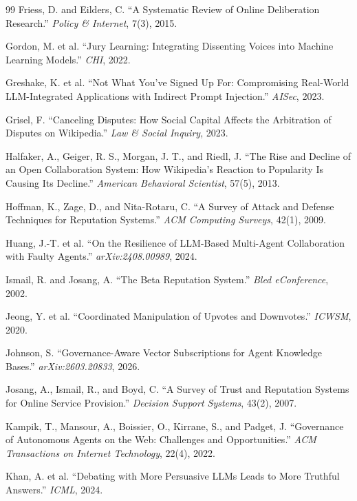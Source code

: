 \documentclass[11pt]{article}
\begin{document}
\begin{thebibliography}{99}
 Friess, D. and Eilders, C. ``A Systematic Review of Online Deliberation Research.'' \textit{Policy \& Internet}, 7(3), 2015.

 Gordon, M. et al. ``Jury Learning: Integrating Dissenting Voices into Machine Learning Models.'' \textit{CHI}, 2022.

 Greshake, K. et al. ``Not What You've Signed Up For: Compromising Real-World LLM-Integrated Applications with Indirect Prompt Injection.'' \textit{AISec}, 2023.

 Grisel, F. ``Canceling Disputes: How Social Capital Affects the Arbitration of Disputes on Wikipedia.'' \textit{Law \& Social Inquiry}, 2023.

 Halfaker, A., Geiger, R. S., Morgan, J. T., and Riedl, J. ``The Rise and Decline of an Open Collaboration System: How Wikipedia's Reaction to Popularity Is Causing Its Decline.'' \textit{American Behavioral Scientist}, 57(5), 2013.

 Hoffman, K., Zage, D., and Nita-Rotaru, C. ``A Survey of Attack and Defense Techniques for Reputation Systems.'' \textit{ACM Computing Surveys}, 42(1), 2009.

 Huang, J.-T. et al. ``On the Resilience of LLM-Based Multi-Agent Collaboration with Faulty Agents.'' \textit{arXiv:2408.00989}, 2024.

 Ismail, R. and Josang, A. ``The Beta Reputation System.'' \textit{Bled eConference}, 2002.

 Jeong, Y. et al. ``Coordinated Manipulation of Upvotes and Downvotes.'' \textit{ICWSM}, 2020.

 Johnson, S. ``Governance-Aware Vector Subscriptions for Agent Knowledge Bases.'' \textit{arXiv:2603.20833}, 2026.

 Josang, A., Ismail, R., and Boyd, C. ``A Survey of Trust and Reputation Systems for Online Service Provision.'' \textit{Decision Support Systems}, 43(2), 2007.

 Kampik, T., Mansour, A., Boissier, O., Kirrane, S., and Padget, J. ``Governance of Autonomous Agents on the Web: Challenges and Opportunities.'' \textit{ACM Transactions on Internet Technology}, 22(4), 2022.

 Khan, A. et al. ``Debating with More Persuasive LLMs Leads to More Truthful Answers.'' \textit{ICML}, 2024.


\end{thebibliography}
\end{document}
